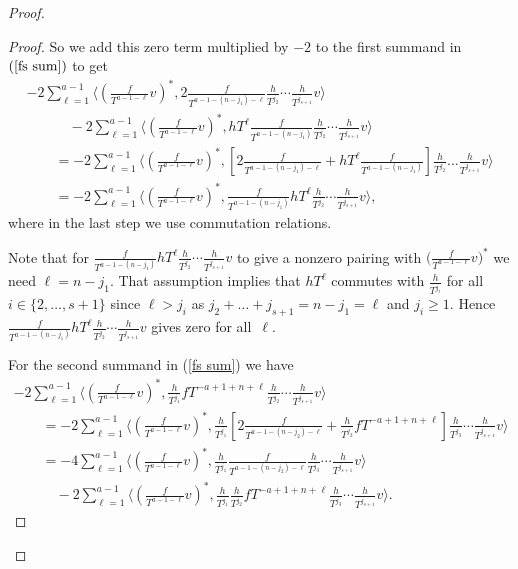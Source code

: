 \begin{proof}
\begin{proof}
So we add this zero term multiplied by $-2$ to the first summand in $(\ref{fs sum})$ to get
\begin{gather}
 -2 \sum_{\ell=1}^{a-1} \bigg\langle \left(\frac{f}{T^{a-1-\ell}}v\right)^*, 2\frac{f}{T^{a-1 - (n-j_1) -\ell}}\frac{h}{T^{j_2}}\cdots\frac{h}{T^{j_{s+1}}} v \bigg\rangle \nonumber \\
\qquad\quad{} -2 \sum_{\ell=1}^{a-1} \bigg\langle \left(\frac{f}{T^{a-1-\ell}}v\right)^*, hT^{\ell} \frac{f}{T^{a-1-(n-j_1)}} \frac{h}{T^{j_2}}\cdots\frac{h}{T^{j_{s+1}}} v \bigg\rangle \label{trick_notes} \\
\qquad{} = -2 \sum_{\ell=1}^{a-1} \bigg\langle \left(\frac{f}{T^{a-1-\ell}}v\right)^*, \left[ 2\frac{f}{T^{a-1 - (n-j_1) - \ell}} + hT^{\ell} \frac{f}{T^{a-1-(n-j_1)}} \right] \frac{h}{T^{j_2}}\dots\frac{h}{T^{j_{s+1}}} v \bigg\rangle \nonumber \\
\qquad{} = -2 \sum_{\ell=1}^{a-1} \bigg\langle \left(\frac{f}{T^{a-1-\ell}}v\right)^*, \frac{f}{T^{a-1-(n-j_1)}} hT^{\ell} \frac{h}{T^{j_2}}\cdots\frac{h}{T^{j_{s+1}}} v \bigg\rangle, \nonumber
\end{gather}
where in the last step we use commutation relations.

Note that for $ \frac{f}{T^{a-1-(n-j_1)}} hT^{\ell} \frac{h}{T^{j_2}} \cdots \frac{h}{T^{j_{s+1}}} v $ to give a nonzero pairing with $\big(\frac{f}{T^{a-1-\ell}}v\big)^*$ we need $\ell=n-j_1$. That assumption implies that $hT^{\ell}$ commutes with $\frac{h}{T^{j_i}}$ for all $i \in \{2, \dots, s+1\}$ since $\ell>j_i$ as $j_2+\dots+ j_{s+1} =n - j_1=\ell$ and $j_i \geq 1$. Hence $\frac{f}{T^{a-1-(n-j_1)}} hT^{\ell} \frac{h}{T^{j_2}} \cdots \frac{h}{T^{j_{s+1}}} v $ gives zero for all~$\ell$.

For the second summand in (\ref{fs sum}) we have
\begin{gather}
- 2 \sum_{\ell=1}^{a-1} \bigg\langle \left(\frac{f}{T^{a-1-\ell}}v\right)^*, \frac{h}{T^{j_1}} fT^{-a+1 + n + \ell} \frac{h}{T^{j_2}}\cdots\frac{h}{T^{j_{s+1}}}v \bigg\rangle
\nonumber \\
\qquad{} = - 2 \sum_{\ell=1}^{a-1} \bigg\langle \left(\frac{f}{T^{a-1-\ell}}v\right)^*, \frac{h}{T^{j_1}} \left[ 2 \frac{f}{T^{a-1 - (n-j_2) - \ell}} + \frac{h}{T^{j_2}} fT^{-a+1 + n +\ell} \right] \frac{h}{T^{j_3}} \cdots\frac{h}{T^{j_{s+1}}}v \bigg\rangle \nonumber \\
\qquad{} = - 4 \sum_{\ell=1}^{a-1} \bigg\langle \left(\frac{f}{T^{a-1-\ell}}v\right)^*, \frac{h}{T^{j_1}} \frac{f}{T^{a-1 - (n-j_2) - \ell}} \frac{h}{T^{j_3}} \cdots\frac{h}{T^{j_{s+1}}}v \bigg\rangle \label{ind1} \\
\qquad\quad{} - 2 \sum_{\ell=1}^{a-1} \bigg\langle \left(\frac{f}{T^{a-1-\ell}}v\right)^*, \frac{h}{T^{j_1}} \frac{h}{T^{j_2}} fT^{-a+1 + n +\ell} \frac{h}{T^{j_3}} \cdots\frac{h}{T^{j_{s+1}}}v \bigg\rangle. \label{ind2}
\end{gather}


\end{proof}
\end{proof}
